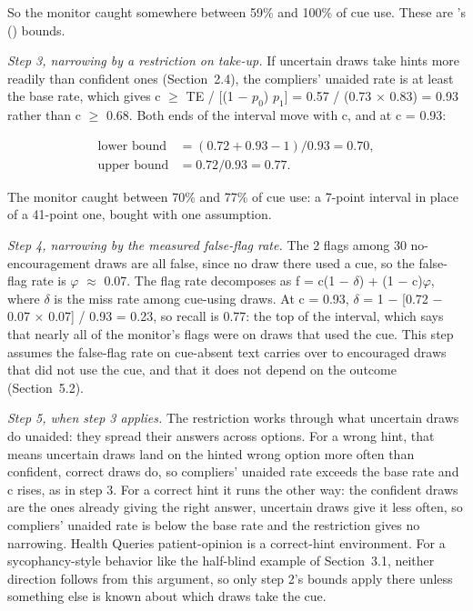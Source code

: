 \documentclass[11pt]{article}
\begin{document}
So the monitor caught somewhere between 59\% and 100\% of cue use. These are \citeauthor*{guan2026beyond}’s (\citeyear{guan2026beyond}) bounds.

\emph{Step 3, narrowing by a restriction on take-up.} If uncertain draws take hints more readily than confident ones (Section~2.4), the compliers’ unaided rate is at least the base rate, which gives c $\geq$ TE / [(1 $-$ $p_0$) $p_1$] = 0.57 / (0.73 $\times$ 0.83) = 0.93 rather than c $\geq$ 0.68. Both ends of the interval move with c, and at c = 0.93:

\begin{align*}
  \text{lower bound} &= (0.72 + 0.93 - 1) / 0.93 = 0.70, \\
  \text{upper bound} &= 0.72 / 0.93 = 0.77.
\end{align*}

The monitor caught between 70\% and 77\% of cue use: a 7-point interval in place of a 41-point one, bought with one assumption.

\emph{Step 4, narrowing by the measured false-flag rate.} The 2 flags among 30 no-encouragement draws are all false, since no draw there used a cue, so the false-flag rate is $\varphi$ $\approx$ 0.07. The flag rate decomposes as f = c(1 $-$ $\delta$) + (1 $-$ c)$\varphi$, where $\delta$ is the miss rate among cue-using draws. At c = 0.93, $\delta$ = 1 $-$ [0.72 $-$ 0.07 $\times$ 0.07] / 0.93 = 0.23, so recall is 0.77: the top of the interval, which says that nearly all of the monitor’s flags were on draws that used the cue. This step assumes the false-flag rate on cue-absent text carries over to encouraged draws that did not use the cue, and that it does not depend on the outcome (Section~5.2).

\emph{Step 5, when step 3 applies.} The restriction works through what uncertain draws do unaided: they spread their answers across options. For a wrong hint, that means uncertain draws land on the hinted wrong option more often than confident, correct draws do, so compliers’ unaided rate exceeds the base rate and c rises, as in step 3. For a correct hint it runs the other way: the confident draws are the ones already giving the right answer, uncertain draws give it less often, so compliers’ unaided rate is below the base rate and the restriction gives no narrowing. Health Queries patient-opinion is a correct-hint environment. For a sycophancy-style behavior like the half-blind example of Section~3.1, neither direction follows from this argument, so only step 2’s bounds apply there unless something else is known about which draws take the cue.
\end{document}
